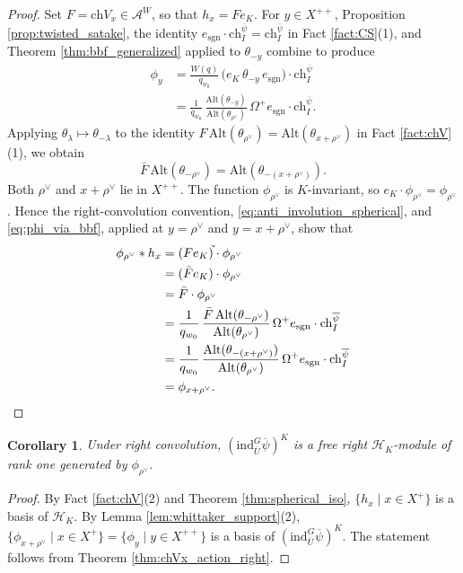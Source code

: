 \documentclass[12pt]{article}
\numberwithin{equation}{section}
\newtheorem{corollary}[theorem]{Corollary}
\theoremstyle{definition}
\theoremstyle{remark}
\theoremstyle{plain}
\begin{document}
\begin{proof}
Set $F = \mathrm{ch}V_x \in \mathcal{A}^W$, so that $h_x=Fe_K$. For $y \in X^{++}$, Proposition \ref{prop:twisted_satake}, the identity $e_{\mathrm{sgn}} \cdot \mathrm{ch}_I^{\overline{\psi}} = \mathrm{ch}_I^{\overline{\psi}}$ in Fact \ref{fact:CS}(1), and Theorem \ref{thm:bbf_generalized} applied to $\theta_{-y}$ combine to produce
\begin{equation}\label{eq:phi_via_bbf}
\begin{aligned}
\phi_y
&= \frac{W(q)}{q_{w_0}}\,\big(e_K\,\theta_{-y}\,e_{\mathrm{sgn}}\big)\cdot\mathrm{ch}_I^{\overline{\psi}}\\
&= \frac{1}{q_{w_0}}\,
\frac{\mathrm{Alt}(\theta_{-y})}{\mathrm{Alt}(\theta_{\rho^\vee})}\,
\Omega^+e_{\mathrm{sgn}}\cdot\mathrm{ch}_I^{\overline{\psi}}.
\end{aligned}
\end{equation}
Applying $\theta_\lambda \mapsto \theta_{-\lambda}$ to the identity
$F\,\mathrm{Alt}(\theta_{\rho^\vee})=\mathrm{Alt}(\theta_{x+\rho^\vee})$ in Fact \ref{fact:chV}(1), we obtain
\[
\bar F\,\mathrm{Alt}(\theta_{-\rho^\vee})
=\mathrm{Alt}(\theta_{-(x+\rho^\vee)}).
\]
Both $\rho^\vee$ and $x+\rho^\vee$ lie in $X^{++}$. The function $\phi_{\rho^\vee}$ is $K$-invariant, so $e_K\cdot\phi_{\rho^\vee}=\phi_{\rho^\vee}$. Hence the right-convolution convention, \eqref{eq:anti_involution_spherical}, and \eqref{eq:phi_via_bbf}, applied at $y=\rho^\vee$ and $y=x+\rho^\vee$, show that
\begin{align*}
\phi_{\rho^\vee}*h_x
&=(Fe_K)\check{\vphantom{f}}\cdot\phi_{\rho^\vee}\\
&=(\bar Fe_K)\cdot\phi_{\rho^\vee}\\
&=\bar F\cdot\phi_{\rho^\vee}\\
&=\frac{1}{q_{w_0}}\,
\frac{\bar F\,\mathrm{Alt}(\theta_{-\rho^\vee})}
{\mathrm{Alt}(\theta_{\rho^\vee})}\,
\Omega^+e_{\mathrm{sgn}}\cdot\mathrm{ch}_I^{\overline{\psi}}\\
&=\frac{1}{q_{w_0}}\,
\frac{\mathrm{Alt}(\theta_{-(x+\rho^\vee)})}
{\mathrm{Alt}(\theta_{\rho^\vee})}\,
\Omega^+e_{\mathrm{sgn}}\cdot\mathrm{ch}_I^{\overline{\psi}}\\
&=\phi_{x+\rho^\vee}. \qedhere
\end{align*}
\end{proof}

\begin{corollary}\label{cor:freeness_p}
Under right convolution, $(\mathrm{ind}_{\overline{U}}^{G}\overline{\psi})^{K}$ is a free right $\mathcal{H}_K$-module of rank one generated by $\phi_{\rho^\vee}$.
\end{corollary}
\begin{proof}
By Fact \ref{fact:chV}(2) and Theorem \ref{thm:spherical_iso}, $\{h_x\mid x\in X^+\}$ is a basis of $\mathcal H_K$. By Lemma \ref{lem:whittaker_support}(2), $\{\phi_{x+\rho^\vee}\mid x\in X^+\}=\{\phi_y\mid y\in X^{++}\}$ is a basis of $(\mathrm{ind}_{\overline U}^G\overline\psi)^K$. The statement follows from Theorem \ref{thm:chVx_action_right}.
\end{proof}
\end{document}
